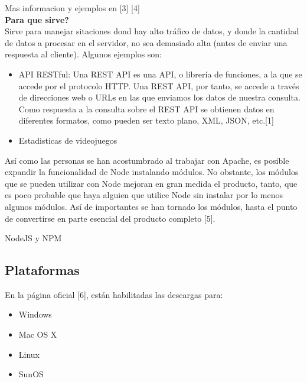 Mas informacion y ejemplos en [3] [4]\\



\textbf{Para que sirve?}\\
Sirve para  manejar sitaciones dond hay alto tráfico de datos, y donde la cantidad de datos a procesar en el servidor, no 
sea demasiado alta (antes de enviar una respuesta al cliente). Algunos ejemplos son:

\begin{itemize}
 \item API RESTful: Una REST API es una API, o librería de funciones, a la que se accede por el protocolo HTTP. 
Una REST API, por tanto, se accede a través de direcciones web o URLs en las que enviamos los datos de nuestra consulta. 
Como respuesta a la consulta sobre el REST API se obtienen datos en diferentes formatos, como pueden ser texto plano, 
XML, JSON, etc.[1]
 \item Estadisticas de videojuegos
\end{itemize}





Así como las personas se han acostumbrado al trabajar con Apache, es posible expandir la funcionalidad de Node 
instalando módulos. No obstante, los módulos que se pueden utilizar con Node mejoran en gran medida el producto, tanto, 
que es poco probable que haya alguien que utilice Node sin instalar por lo menos algunos módulos. Así de importantes se 
han tornado los módulos, hasta el punto de convertirse en parte esencial del producto completo [5].


NodeJS y NPM


\subsection{Plataformas}

En la página oficial [6], están habilitadas las descargas para:
\begin{itemize}
 \item Windows
 \item Mac OS X
 \item Linux
 \item SunOS
\end{itemize}

